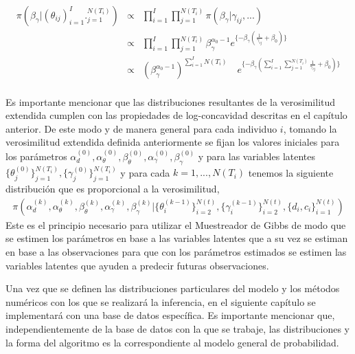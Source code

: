 \\
\begin{eqnarray*}
\pi(\beta_\gamma|(\theta_{ij})_{i=1}^I ._{j=1}^{N(T_i)})&\propto & \prod_{i=1}^I \prod_{j=1}^{N(T_i)} \pi(\beta_\gamma|\gamma_{ij},...)\\
&\propto & \prod_{i=1}^I \prod_{j=1}^{N(T_i)} \beta_\gamma^{\alpha_0-1}e^{\{-\beta_\gamma(\frac{1}{\gamma_{ij}}+\beta_0)\}}\\
&\propto & (\beta_\gamma^{\alpha_0-1})^{\sum_{i=1}^I N(T_i)} \quad e^{\{-\beta_\gamma(\sum_{i=1}^I \sum_{j=1}^{N(T_i)}\frac{1}{\gamma_{ij}}+\beta_0)\}}
\end{eqnarray*}
\\
Es importante mencionar que las distribuciones resultantes de la verosimilitud extendida cumplen con las propiedades de log-concavidad descritas en el cap\'itulo anterior. De este modo y de  manera general para cada individuo $i$, tomando la verosimilitud extendida definida anteriormente se fijan los valores iniciales para los par\'ametros $\alpha_d^{(0)},\alpha_\theta^{(0)},\beta_\theta^{(0)},\alpha_\gamma^{(0)},\beta_\gamma^{(0)}$ y para las variables latentes $\{\theta_j^{(0)}\}_{j=1}^{N(T_i)},\{\gamma_j^{(0)}\}_{j=1}^{N(T_i)}$ y para cada $k=1,...,N(T_i)$ tenemos la siguiente distribuci\'on que es proporcional a la verosimilitud,
\begin{align*}
\pi(\alpha_d^{(k)},\alpha_\theta^{(k)},\beta_\theta^{(k)},\alpha_\gamma^{(k)},\beta_\gamma^{(k)}|\{\theta_i^{(k-1)}\}_{i=2}^{N(t)},\{\gamma_i^{(k-1)}\}_{i=2}^{N(t)},\{d_i,c_i\}_{i=1}^{N(t)})
\end{align*}
Este es el principio necesario para utilizar el Muestreador de Gibbs de modo que se estimen los par\'ametros en base a las variables latentes que a su vez se estiman en base a las observaciones para que con los par\'ametros estimados se estimen las variables latentes que ayuden a predecir futuras observaciones. %

Una vez que se definen las distribuciones particulares del modelo y los m\'etodos num\'ericos con los que se realizar\'a la inferencia, en el siguiente cap\'itulo se implementar\'a con una base de datos espec\'ifica. Es importante mencionar que, independientemente de la base de datos con la que se trabaje, las distribuciones y la forma del algoritmo es la correspondiente al modelo general de probabilidad.